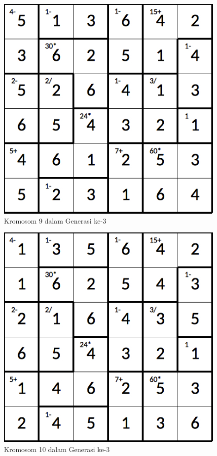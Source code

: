 \begin{figure}
\centering
\captionsetup{justification=centering}
\includegraphics[scale=0.333]{Gambar/hybridgenetic/Generation3Chromosome9}
\caption[Kromosom 9 dalam Generasi ke-3]{Kromosom 9 dalam Generasi ke-3}
\label{fig:analisisg3k9}
\end{figure}

\begin{figure}
\centering
\captionsetup{justification=centering}
\includegraphics[scale=0.333]{Gambar/hybridgenetic/Generation3Chromosome10}
\caption[Kromosom 10 dalam Generasi ke-3]{Kromosom 10 dalam Generasi ke-3}
\label{fig:analisisg3k10}
\end{figure}

